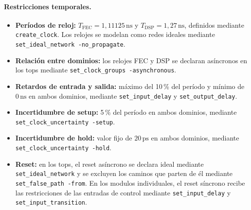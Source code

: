 \documentclass[10pt,a4paper]{article}
\begin{document}
\paragraph{Restricciones temporales.}
\begin{itemize}
    \item \textbf{Períodos de reloj:}
    $T_{\mathrm{FEC}}=1{,}11125\,\mathrm{ns}$ y
    $T_{\mathrm{DSP}}=1{,}27\,\mathrm{ns}$, definidos mediante
    \texttt{create\_clock}. Los relojes se modelan como redes ideales
    mediante \texttt{set\_ideal\_network -no\_propagate}.

    \item \textbf{Relación entre dominios:}
    los relojes FEC y DSP se declaran asíncronos en los tops mediante
    \texttt{set\_clock\_groups -asynchronous}.

    \item \textbf{Retardos de entrada y salida:}
    máximo del 10\,\% del período y mínimo de $0\,\mathrm{ns}$ en
    ambos dominios, mediante \texttt{set\_input\_delay} y
    \texttt{set\_output\_delay}.

    \item \textbf{Incertidumbre de setup:}
    5\,\% del período en ambos dominios, mediante
    \texttt{set\_clock\_uncertainty -setup}.

    \item \textbf{Incertidumbre de hold:}
    valor fijo de $20\,\mathrm{ps}$ en ambos dominios, mediante
    \texttt{set\_clock\_uncertainty -hold}.

    \item \textbf{Reset:}
    en los tops, el reset asíncrono se declara ideal mediante
    \texttt{set\_ideal\_network} y se excluyen los caminos que parten
    de él mediante \texttt{set\_false\_path -from}.
    En los modulos individuales, el reset síncrono recibe las 
    restricciones de las entradas de control mediante 
    \texttt{set\_input\_delay} y \texttt{set\_input\_transition}.
\end{itemize}
\end{document}
